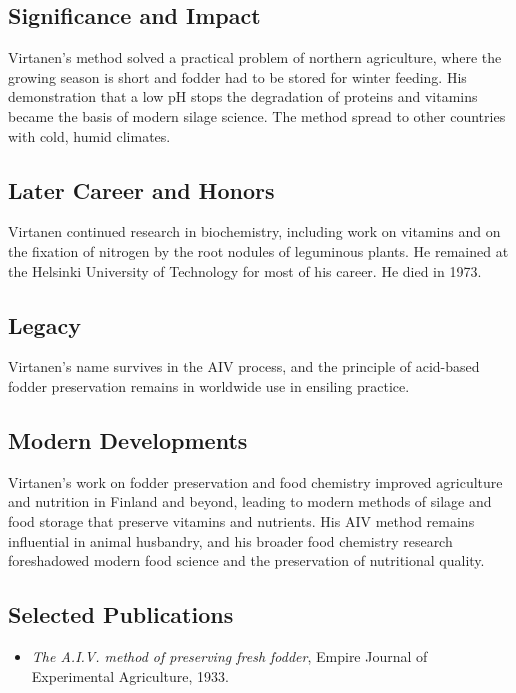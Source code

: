 \subsection*{Significance and Impact}

Virtanen's method solved a practical problem of northern agriculture, where the growing season is short and fodder had to be stored for winter feeding. His demonstration that a low pH stops the degradation of proteins and vitamins became the basis of modern silage science. The method spread to other countries with cold, humid climates.

\subsection*{Later Career and Honors}

Virtanen continued research in biochemistry, including work on vitamins and on the fixation of nitrogen by the root nodules of leguminous plants. He remained at the Helsinki University of Technology for most of his career. He died in 1973.

\subsection*{Legacy}

Virtanen's name survives in the AIV process, and the principle of acid-based fodder preservation remains in worldwide use in ensiling practice.

\subsection*{Modern Developments}

Virtanen's work on fodder preservation and food chemistry improved agriculture and nutrition in Finland and beyond, leading to modern methods of silage and food storage that preserve vitamins and nutrients. His AIV method remains influential in animal husbandry, and his broader food chemistry research foreshadowed modern food science and the preservation of nutritional quality.

\subsection*{Selected Publications}

\begin{itemize}

\item \emph{The A.I.V. method of preserving fresh fodder}, Empire Journal of Experimental Agriculture, 1933.

\end{itemize}

